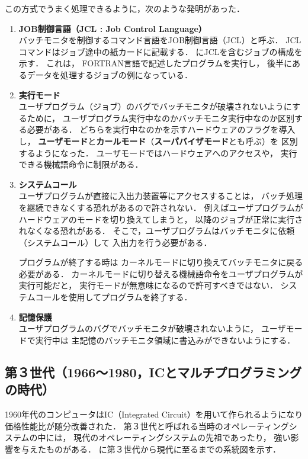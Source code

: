 

この方式でうまく処理できるように，次のような発明があった．

\begin{enumerate}
\item {\bf JOB制御言語（JCL : Job Control Language）} \\
バッチモニタを制御するコマンド言語をJOB制御言語（JCL）と呼ぶ．
JCLコマンドはジョブ途中の紙カードに記載する．
にJCLを含むジョブの構成を示す．
これは，
FORTRAN言語で記述したプログラムを実行し，
後半にあるデータを処理するジョブの例になっている．


\item {\bf 実行モード} \\
ユーザプログラム（ジョブ）のバグでバッチモニタが破壊されないようにするために，
ユーザプログラム実行中なのかバッチモニタ実行中なのか区別する必要がある．
どちらを実行中なのかを示すハードウェアのフラグを導入し，
{\bf ユーザモード}と{\bf カールモード}（{\bf スーパバイザモード}とも呼ぶ）を
区別するようになった．
ユーザモードではハードウェアへのアクセスや，
実行できる機械語命令に制限がある．

\item {\bf システムコール} \\
ユーザプログラムが直接に入出力装置等にアクセスすることは，
バッチ処理を継続できなくする恐れがあるので許されない．
例えばユーザプログラムがハードウェアのモードを切り換えてしまうと，
以降のジョブが正常に実行されなくなる恐れがある．
そこで，ユーザプログラムはバッチモニタに依頼（システムコール）して
入出力を行う必要がある．

プログラムが終了する時は
カーネルモードに切り換えてバッチモニタに戻る必要がある．
カーネルモードに切り替える機械語命令をユーザプログラムが実行可能だと，
実行モードが無意味になるので許可すべきではない．
システムコールを使用してプログラムを終了する．

\item {\bf 記憶保護} \\
ユーザプログラムのバグでバッチモニタが破壊されないように，
ユーザモードで実行中は
主記憶のバッチモニタ領域に書込みができないようにする．
\end{enumerate}

\subsection{第３世代（1966〜1980，ICとマルチプログラミングの時代）}
1960年代のコンピュータはIC（Integrated Circuit）を用いて作られるようになり
価格性能比が随分改善された．
第３世代と呼ばれる当時のオペレーティングシステムの中には，
現代のオペレーティングシステムの先祖であったり，
強い影響を与えたものがある．
に第３世代から現代に至るまでの系統図を示す．


